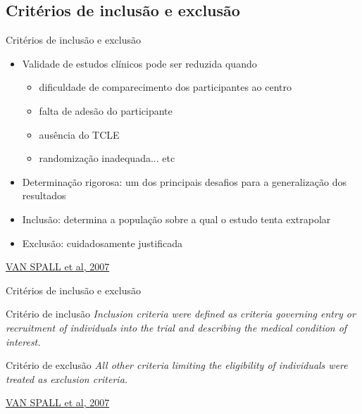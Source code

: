 \documentclass{beamer}
\begin{document}
\subsection{Critérios de inclusão e exclusão}

\begin{frame}{Critérios de inclusão e exclusão}
  \begin{itemize}
    \footnotesize
  \item Validade de estudos clínicos pode ser reduzida quando
    \begin{itemize}
      \scriptsize
    \item dificuldade de comparecimento dos participantes ao centro
    \item falta de adesão do participante
    \item ausência do TCLE
    \item randomização inadequada... etc
    \end{itemize}
    \medskip
  \item Determinação rigorosa: um dos principais desafios para a generalização dos resultados
    \medskip
  \item Inclusão: determina a população sobre a qual o estudo tenta extrapolar
    \medskip
  \item Exclusão: cuidadosamente justificada
  \end{itemize}

  \vfill
  \scriptsize
  \hfill \href{https://doi.org/10.1001/jama.297.11.1233}{VAN SPALL et al, 2007}
\end{frame}

\begin{frame}{Critérios de inclusão e exclusão}
  \begin{block}{Critério de inclusão}
    \footnotesize
    {\em Inclusion criteria were defined as criteria governing entry or
    recruitment of individuals into the trial and describing the
    medical condition of interest.}
  \end{block}
  \begin{block}{Critério de exclusão}
    \footnotesize
    {\em All other criteria limiting the eligibility of individuals were
    treated as exclusion criteria.}
  \end{block}

  \vfill
  \scriptsize
  \hfill \href{https://doi.org/10.1001/jama.297.11.1233}{VAN SPALL et al, 2007}
\end{frame}
\end{document}
